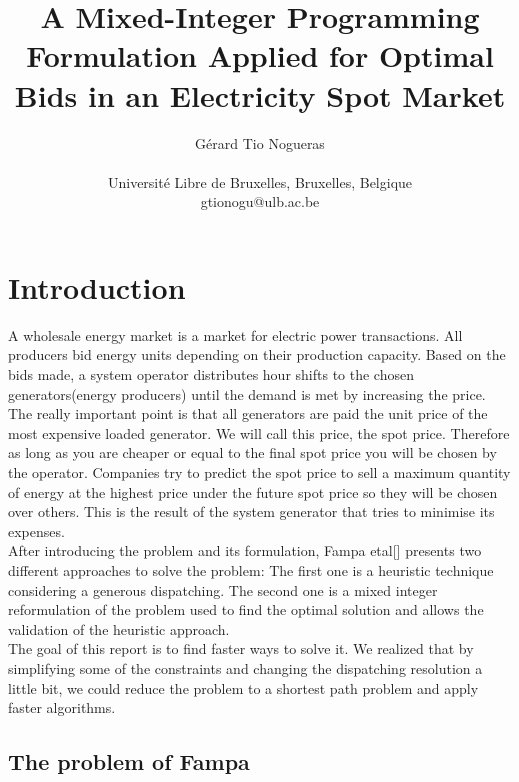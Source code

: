 \documentclass[letterpaper]{article}
\title{A Mixed-Integer Programming Formulation Applied for Optimal Bids in an Electricity Spot Market}
\author{Gérard Tio Nogueras \\
\mbox{}\\
Université Libre de Bruxelles, Bruxelles, Belgique\\
gtionogu@ulb.ac.be}
\begin{document}
\maketitle

\begin{abstract}
\end{abstract}



\section{Introduction}

A wholesale energy market is a market for electric power transactions. All producers bid energy units depending on their production capacity. Based on the bids made, a system operator distributes hour shifts to the chosen generators(energy producers) until the demand is met by increasing the price. The really important point is that all generators are paid the unit price of the most expensive loaded generator. We will call this price, the spot price. Therefore as long as you are cheaper or equal to the final spot price you will be chosen by the operator. Companies try to predict the spot price to sell a maximum quantity of energy at the highest price under the future spot price so they will be chosen over others.
This is the result of the system generator that tries to minimise its expenses.\\
After introducing the problem and its formulation, Fampa etal[] 
presents two different approaches to solve the problem: The first one is a heuristic technique considering a generous dispatching.
The second one is a mixed integer reformulation of the problem used to find the optimal solution and allows the validation of the heuristic approach.\\
The goal of this report is to find faster ways to solve it. We realized that by simplifying some of the constraints and changing the dispatching resolution a little bit, we could reduce the problem to a shortest path problem and apply faster algorithms.
\newpage
\subsection{The problem of Fampa}
\end{document}
